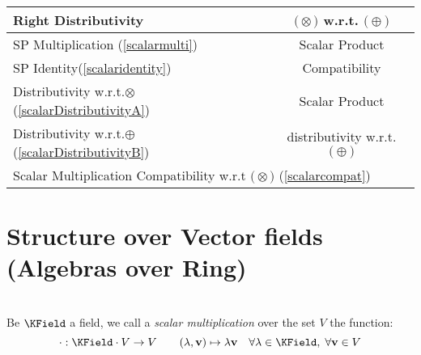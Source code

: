 \documentclass[a4paper,12pt]{scrartcl}    %
\newcommand{\OpA}{\otimes}
\newcommand{\OpB}{\oplus}
\begin{document}
\begin{landscape}
\begin{minipage}[t][]{0.60 \linewidth}
\begin{minipage}[c]{0,5\textwidth}
\begin{tabular}{|l|c|}
			    \cellcolor{blue!25} \footnotesize Right Distributivity & \tiny\cellcolor{yellow!25} $\big(\OpA\big)$ w.r.t. $\big(\OpB\big)$  \\
			   \hline
			  \hline
			     \cellcolor{blue!25} \footnotesize SP Multiplication (\ref{scalarmulti})&  \tiny\cellcolor{yellow!25}Scalar Product\\
			    \cellcolor{blue!25} \footnotesize SP Identity(\ref{scalaridentity}) & \tiny\cellcolor{yellow!25} Compatibility  \\
			   \hline 
			    \cellcolor{blue!25} \footnotesize Distributivity w.r.t.$\OpA$ (\ref{scalarDistributivityA})&  \tiny\cellcolor{yellow!25}Scalar Product\\
			    \cellcolor{blue!25} \footnotesize Distributivity w.r.t.$\OpB$ (\ref{scalarDistributivityB}) & \tiny\cellcolor{yellow!25} distributivity w.r.t. $\big(\OpB\big)$  \\
			   \hline
			    \multicolumn{2}{l}{\footnotesize \cellcolor{blue!25} Scalar Multiplication Compatibility w.r.t  $\big(\OpA\big)$ (\ref{scalarcompat})}\\
			   \hline
			\end{tabular}
			\vfill
		\end{minipage}
	\end{minipage}	

\newpage
	\begin{minipage}[c][\textheight]{0.30 \linewidth}
	    \section*{Structure over Vector fields (Algebras over Ring)}
	    \mbox{}\\
			Be $\KField$ a field, we call a \emph{scalar multiplication} over the set $V$ the function:
				\begin{displaymath}
					\cdot : \KField \cdot V \rightarrow  V \qquad (\lambda, \mathbf{v}) \mapsto \lambda \mathbf{v} \quad \forall \lambda \in \KField,\; 
					\forall \mathbf{v} \in V
				\end{displaymath}
			

\end{minipage}
\end{landscape}
\end{document}
